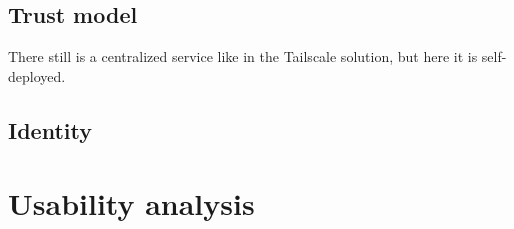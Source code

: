 \hypertarget{trust-model}{%
\subsection{Trust model}\label{trust-model}}

There still is a centralized service like in the Tailscale solution, but
here it is self-deployed.

\hypertarget{identity}{%
\subsection{Identity}\label{identity}}

\hypertarget{usability-analysis}{%
\section{Usability analysis}\label{usability-analysis}}
